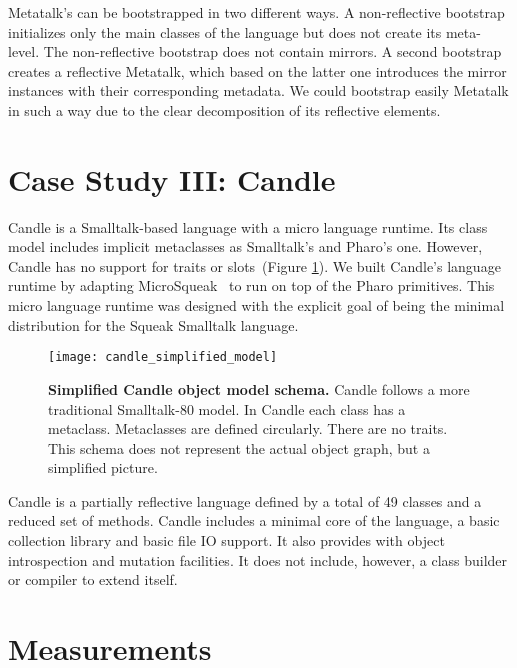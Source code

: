 Metatalk's can be bootstrapped in two different ways. A non-reflective bootstrap initializes only the main classes of the language but does not create its meta-level. The non-reflective bootstrap does not contain mirrors. A second bootstrap creates a reflective Metatalk, which based on the latter one introduces the mirror instances with their corresponding metadata. We could bootstrap easily Metatalk in such a way due to the clear decomposition of its reflective elements. 

\section{Case Study III: Candle} \label{sec:bootstrap_candle}

Candle is a Smalltalk-based language with a micro language runtime. Its class model includes implicit metaclasses as Smalltalk's and Pharo's one. However, Candle has no support for traits or slots~(Figure \ref{fig:candle_simplified_model}). We built Candle's language runtime by adapting MicroSqueak~\cite{Malo11a} to run on top of the Pharo \VM primitives. This micro language runtime was designed with the explicit goal of being the minimal distribution for the Squeak Smalltalk language.

\begin{figure}[ht]
\center
\texttt{[image: candle\_simplified\_model]}
\caption{\textbf{Simplified Candle object model schema.} Candle follows a more traditional Smalltalk-80 model. In Candle each class has a metaclass. Metaclasses are defined circularly. There are no traits. This schema does not represent the actual object graph, but a simplified picture.\label{fig:candle_simplified_model}}
\end{figure}


Candle is a partially reflective language defined by a total of 49 classes and a reduced set of methods. Candle includes a minimal core of the language, a basic collection library and basic file IO support. It also provides with object introspection and mutation facilities. It does not include, however, a class builder or compiler to extend itself.%

\section{Measurements}

